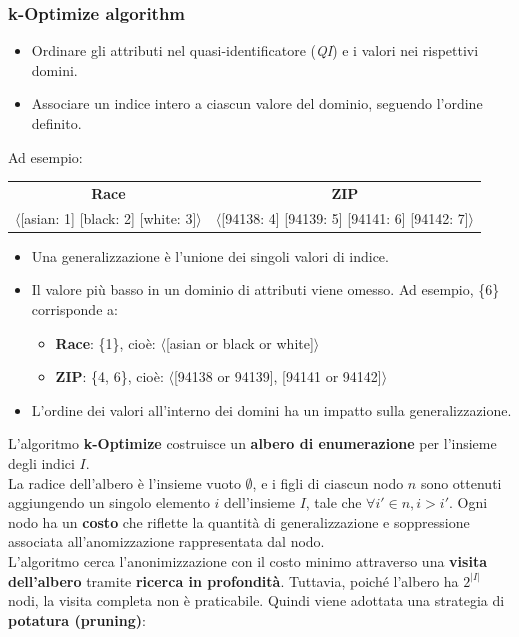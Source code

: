 \documentclass{report}
\begin{document}
\subsubsection{k-Optimize algorithm}

\begin{itemize}
    \item Ordinare gli attributi nel quasi-identificatore (\textit{QI}) e i valori nei rispettivi domini.
    \item Associare un indice intero a ciascun valore del dominio, seguendo l'ordine definito.
\end{itemize}

\noindent Ad esempio:
\begin{center}
    \begin{tabular}{cc}
        \textbf{Race} & \textbf{ZIP} \\
        $\langle$[asian: 1] [black: 2] [white: 3]$\rangle$ & $\langle$[94138: 4] [94139: 5] [94141: 6] [94142: 7]$\rangle$ \\
    \end{tabular}
\end{center}

\begin{itemize}
    \item Una generalizzazione è l'unione dei singoli valori di indice.
    \item Il valore più basso in un dominio di attributi viene omesso. Ad esempio, \{6\} corrisponde a:
    \begin{itemize}
        \item \textbf{Race}: \{1\}, cioè: $\langle$[asian or black or white]$\rangle$
        \item \textbf{ZIP}: \{4, 6\}, cioè: $\langle$[94138 or 94139], [94141 or 94142]$\rangle$
    \end{itemize}
    \item L'ordine dei valori all'interno dei domini ha un impatto sulla generalizzazione.
\end{itemize}

\noindent L'algoritmo \textbf{k-Optimize} costruisce un \textbf{albero di enumerazione} per l'insieme degli indici $I$. \\
La radice dell'albero è l'insieme vuoto $\emptyset$, e i figli di ciascun nodo $n$ sono ottenuti aggiungendo un singolo elemento $i$ dell'insieme $I$, tale che $\forall i' \in n, i > i'$. 
Ogni nodo ha un \textbf{costo} che riflette la quantità di generalizzazione e soppressione associata all'anomizzazione rappresentata dal nodo. \\
L'algoritmo cerca l'anonimizzazione con il costo minimo attraverso una \textbf{visita dell'albero} tramite \textbf{ricerca in profondità}. 
Tuttavia, poiché l'albero ha $2^{|I|}$ nodi, la visita completa non è praticabile. Quindi viene adottata una strategia di \textbf{potatura (pruning)}:
\end{document}
